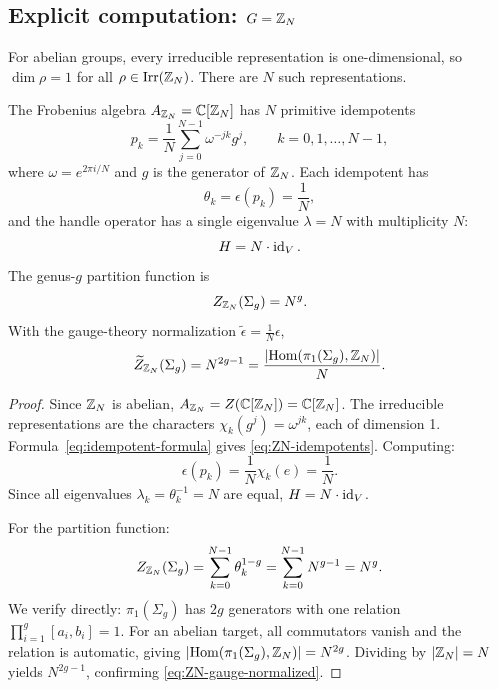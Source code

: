 \subsection{Explicit computation: \texorpdfstring{$G = \mathbb{Z}_N$}{G = Z\_N}}

For abelian groups, every irreducible representation is one-dimensional, so $\dim \rho = 1$ for all $\rho \in \mathrm{Irr}(\mathbb{Z}_N)$. There are $N$ such representations.

\begin{proposition}\label{prop:handle-ZN}
The Frobenius algebra $A_{\mathbb{Z}_N} = \mathbb{C}[\mathbb{Z}_N]$ has $N$ primitive idempotents
\begin{equation}\label{eq:ZN-idempotents}
p_k = \frac{1}{N} \sum_{j=0}^{N-1} \omega^{-jk} g^j, \qquad k = 0, 1, \dots, N-1,
\end{equation}
where $\omega = e^{2\pi i/N}$ and $g$ is the generator of $\mathbb{Z}_N$. Each idempotent has
\begin{equation}\label{eq:ZN-theta}
\theta_k = \epsilon(p_k) = \frac{1}{N},
\end{equation}
and the handle operator has a single eigenvalue $\lambda = N$ with multiplicity $N$:
\begin{equation}\label{eq:ZN-handle-spectrum}
H = N \cdot \operatorname{id}_V.
\end{equation}
The genus-$g$ partition function is
\begin{equation}\label{eq:ZN-genus-g}
Z_{\mathbb{Z}_N}(\Sigma_g) = N^g.
\end{equation}
With the gauge-theory normalization $\widetilde{\epsilon} = \frac{1}{N}\epsilon$,
\begin{equation}\label{eq:ZN-gauge-normalized}
\widetilde{Z}_{\mathbb{Z}_N}(\Sigma_g) = N^{2g-1} = \frac{|\mathrm{Hom}(\pi_1(\Sigma_g), \mathbb{Z}_N)|}{N}.
\end{equation}
\end{proposition}

\begin{proof}
Since $\mathbb{Z}_N$ is abelian, $A_{\mathbb{Z}_N} = Z(\mathbb{C}[\mathbb{Z}_N]) = \mathbb{C}[\mathbb{Z}_N]$. The irreducible representations are the characters $\chi_k(g^j) = \omega^{jk}$, each of dimension 1. Formula~\eqref{eq:idempotent-formula} gives \eqref{eq:ZN-idempotents}. Computing:
\begin{equation}\label{eq:ZN-epsilon-pk}
\epsilon(p_k) = \frac{1}{N}\chi_k(e) = \frac{1}{N}.
\end{equation}
Since all eigenvalues $\lambda_k = \theta_k^{-1} = N$ are equal, $H = N \cdot \operatorname{id}_V$.

For the partition function:
\begin{equation}\label{eq:ZN-partition-calc}
Z_{\mathbb{Z}_N}(\Sigma_g) = \sum_{k=0}^{N-1} \theta_k^{1-g} = \sum_{k=0}^{N-1} N^{g-1} = N^g.
\end{equation}
We verify directly: $\pi_1(\Sigma_g)$ has $2g$ generators with one relation $\prod_{i=1}^g [a_i, b_i] = 1$. For an abelian target, all commutators vanish and the relation is automatic, giving $|\mathrm{Hom}(\pi_1(\Sigma_g), \mathbb{Z}_N)| = N^{2g}$. Dividing by $|\mathbb{Z}_N| = N$ yields $N^{2g-1}$, confirming \eqref{eq:ZN-gauge-normalized}.
\end{proof}

